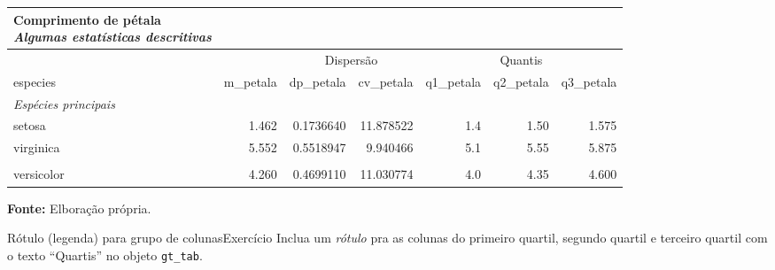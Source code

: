 \documentclass[
  10pt,
  ignorenonframetext,
]{beamer}
\begin{document}
\begin{frame}
\footnotesize

\setlength{\LTpost}{0mm}
\begin{longtable}{lrrrrrr}
\caption*{
{\large \textbf{Comprimento de pétala}} \\ 
{\small \emph{Algumas estatísticas descritivas}}
} \\ 
\toprule
 &  & \multicolumn{2}{c}{Dispersão} & \multicolumn{3}{c}{Quantis} \\ 
\cmidrule(lr){3-4} \cmidrule(lr){5-7}
especies & m\_petala & dp\_petala & cv\_petala & q1\_petala & q2\_petala & q3\_petala \\ 
\midrule
\multicolumn{7}{l}{\emph{Espécies principais}} \\ 
\midrule
setosa & 1.462 & 0.1736640 & 11.878522 & 1.4 & 1.50 & 1.575 \\ 
virginica & 5.552 & 0.5518947 & 9.940466 & 5.1 & 5.55 & 5.875 \\ 
\midrule
\multicolumn{7}{l}{\vspace*{-5mm}} \\ 
versicolor & 4.260 & 0.4699110 & 11.030774 & 4.0 & 4.35 & 4.600 \\ 
\bottomrule
\end{longtable}
\begin{minipage}{\linewidth}
\textbf{Fonte:} Elboração própria.\\
\end{minipage}

\normalsize
\end{frame}

\begin{frame}[fragile]{Rótulo (legenda) para grupo de
colunas\newline Exercício}
\protect\hypertarget{ruxf3tulo-legenda-para-grupo-de-colunasexercuxedcio}{}
Inclua um \emph{rótulo} pra as colunas do primeiro quartil, segundo
quartil e terceiro quartil com o texto ``Quartis'' no objeto
\texttt{gt\_tab}.
\end{frame}
\end{document}
